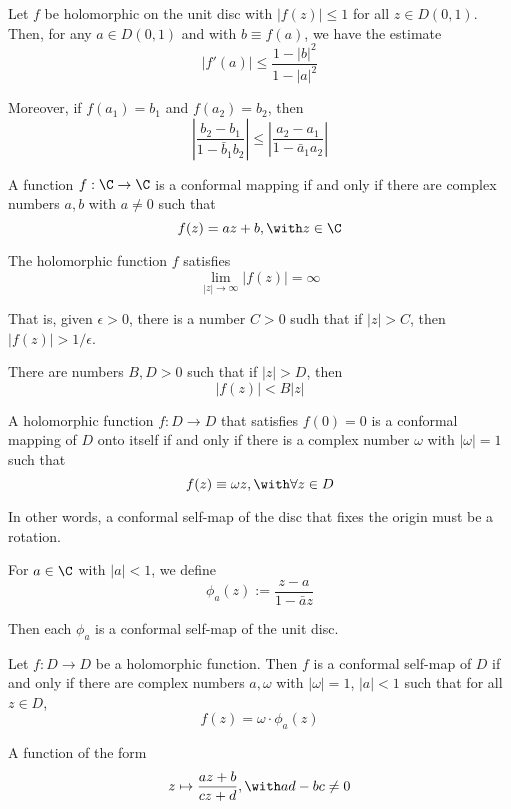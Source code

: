 \label{a244534}

Let $f$ be holomorphic on the unit disc with $|f(z)|\leq1$ for all $z\in
D(0,1)$. Then, for any $a\in D(0,1)$ and with $b\equiv f(a)$, we have the
estimate
$$
  |f'(a)|\leq\frac{1-|b|^2}{1-|a|^2}
$$

Moreover, if $f(a_1)=b_1$ and $f(a_2)=b_2$, then
$$
  \left|\frac{b_2-b_1}{1-\bar b_1b_2}\right|
  \leq
  \left|\frac{a_2-a_1}{1-\bar a_1a_2}\right|
$$

\label{f15ad67}

A function $f:\C\to\C$ is a conformal mapping if and only if there are complex
numbers $a,b$ with $a\neq0$ such that
$$
  f(z)=az+b,\with z\in\C
$$

\label{af84ffc}

The holomorphic function $f$ satisfies
$$
  \lim_{|z|\to\infty}|f(z)|=\infty
$$

That is, given $\epsilon>0$, there is a number $C>0$ sudh that if $|z|>C$, then
$|f(z)|>1/\epsilon$.

\label{f4e6690}

There are numbers $B,D>0$ such that if $|z|>D$, then
$$
  |f(z)|<B|z|
$$

\label{beabf8e}

A holomorphic function $f:D\to D$ that satisfies $f(0)=0$ is a conformal
mapping of $D$ onto itself if and only if there is a complex number $\omega$
with $|\omega|=1$ such that
$$
  f(z)\equiv\omega z,\with\forall z\in D
$$

In other words, a conformal self-map of the disc that fixes the origin must be
a rotation.

\label{e315936}

For $a\in\C$ with $|a|<1$, we define
$$
  \phi_a(z):=\frac{z-a}{1-\bar az}
$$

Then each $\phi_a$ is a conformal self-map of the unit disc.

\label{a05afc4}

Let $f:D\to D$ be a holomorphic function. Then $f$ is a conformal self-map of
$D$ if and only if there are complex numbers $a,\omega$ with $|\omega|=1$,
$|a|<1$ such that for all $z\in D$,
$$
  f(z)=\omega\cdot\phi_a(z)
$$

\label{d5af314}

A function of the form
$$
  z\mapsto\frac{az+b}{cz+d},\with ad-bc\neq0
$$

